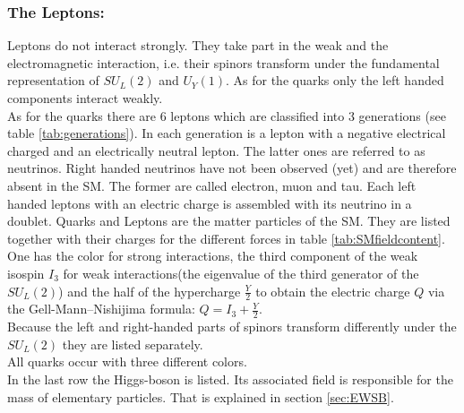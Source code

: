 \subsubsection*{The Leptons:}
Leptons do not interact strongly. They take part in the weak and the electromagnetic interaction, i.e. their spinors transform under the fundamental representation of $SU_L(2)$ and $U_Y(1)$. As for the quarks only the left handed components interact weakly.\\
As for the quarks there are 6 leptons which are classified into 3 generations (see table \ref{tab:generations}). In each generation is a lepton with a negative electrical charged and an electrically neutral lepton. The latter ones are referred to as neutrinos. Right handed neutrinos have not been observed (yet) and are therefore absent in the SM. The former are called electron, muon and tau. Each left handed leptons with an electric charge is assembled with its neutrino in a doublet.
\bigbreak
Quarks and Leptons are the matter particles of the SM. They are listed together with their charges for the different forces in table \ref{tab:SMfieldcontent}. One has the color for strong interactions, the third component of the weak isospin $I_3$ for weak interactions(the eigenvalue of the third generator of the $SU_L(2)$) and the half of the hypercharge $\frac{Y}{2}$ to obtain the electric charge $Q$ via the Gell-Mann–Nishijima formula: $Q = I_3 + \frac{Y}{2}$.\\
Because the left and right-handed parts of spinors transform differently under the $SU_L(2)$ they are listed separately.\\
All quarks occur with three different colors.\\
In the last row the Higgs-boson is listed. Its associated field is responsible for the mass of elementary particles. That is explained in section \ref{sec:EWSB}.\\
